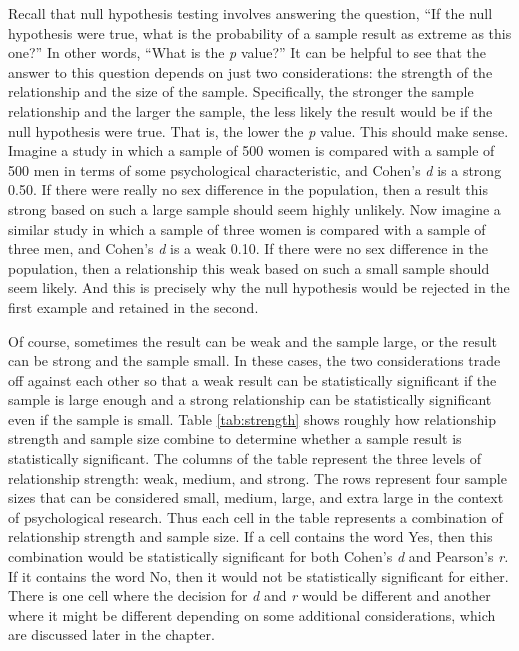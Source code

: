 \documentclass[
]{krantz}
\begin{document}
Recall that null hypothesis testing involves answering the question, ``If the null hypothesis were true, what is the probability of a sample result as extreme as this one?'' In other words, ``What is the \emph{p} value?'' It can be helpful to see that the answer to this question depends on just two considerations: the strength of the relationship and the size of the sample. Specifically, the stronger the sample relationship and the larger the sample, the less likely the result would be if the null hypothesis were true. That is, the lower the \emph{p} value. This should make sense. Imagine a study in which a sample of 500 women is compared with a sample of 500 men in terms of some psychological characteristic, and Cohen's \emph{d} is a strong 0.50. If there were really no sex difference in the population, then a result this strong based on such a large sample should seem highly unlikely. Now imagine a similar study in which a sample of three women is compared with a sample of three men, and Cohen's \emph{d} is a weak 0.10. If there were no sex difference in the population, then a relationship this weak based on such a small sample should seem likely. And this is precisely why the null hypothesis would be rejected in the first example and retained in the second.

Of course, sometimes the result can be weak and the sample large, or the result can be strong and the sample small. In these cases, the two considerations trade off against each other so that a weak result can be statistically significant if the sample is large enough and a strong relationship can be statistically significant even if the sample is small. Table \ref{tab:strength} shows roughly how relationship strength and sample size combine to determine whether a sample result is statistically significant. The columns of the table represent the three levels of relationship strength: weak, medium, and strong. The rows represent four sample sizes that can be considered small, medium, large, and extra large in the context of psychological research. Thus each cell in the table represents a combination of relationship strength and sample size. If a cell contains the word Yes, then this combination would be statistically significant for both Cohen's \emph{d} and Pearson's \emph{r.} If it contains the word No, then it would not be statistically significant for either. There is one cell where the decision for \emph{d} and \emph{r} would be different and another where it might be different depending on some additional considerations, which are discussed later in the chapter.
\end{document}
